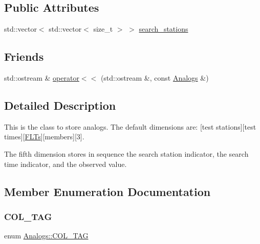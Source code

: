 \subsection*{Public Attributes}
\begin{DoxyCompactItemize}
\item 
std\+::vector$<$ std\+::vector$<$ size\+\_\+t $>$ $>$ \mbox{\hyperlink{class_analogs_a32cff6e74cb1c15dc7fd769ab9835bca}{search\+\_\+stations}}
\end{DoxyCompactItemize}
\subsection*{Friends}
\begin{DoxyCompactItemize}
\item 
std\+::ostream \& \mbox{\hyperlink{class_analogs_a8b1c62cad49a019ac1733168d179cf73}{operator$<$$<$}} (std\+::ostream \&, const \mbox{\hyperlink{class_analogs}{Analogs}} \&)
\end{DoxyCompactItemize}


\subsection{Detailed Description}
This is the class to store analogs. The default dimensions are\+: \mbox{[}test stations\mbox{]}\mbox{[}test times\mbox{]}\mbox{[}\mbox{\hyperlink{class_f_l_ts}{F\+L\+Ts}}\mbox{]}\mbox{[}members\mbox{]}\mbox{[}3\mbox{]}. 

The fifth dimension stores in sequence the search station indicator, the search time indicator, and the observed value. 

\subsection{Member Enumeration Documentation}
\mbox{\label{class_analogs_a9b56dcdb212f44c3ba40a60736d648bb}} 
\subsubsection{\texorpdfstring{C\+O\+L\+\_\+\+T\+AG}{COL\_TAG}}
{\footnotesize\ttfamily enum \mbox{\hyperlink{class_analogs_a9b56dcdb212f44c3ba40a60736d648bb}{Analogs\+::\+C\+O\+L\+\_\+\+T\+AG}}}

